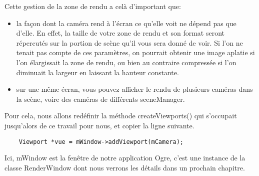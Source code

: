 \documentclass[10pt,a4paper]{report}
\begin{document}
Cette gestion de la zone de rendu a cel\`{a} d'important que:
\begin{itemize}
\item la fa\c{c}on dont la cam\'era rend \`{a} l'\'ecran ce qu'elle voit ne d\'epend pas que d'elle. En effet, la taille de votre zone de rendu et son format seront r\'epercut\'es sur la portion de sc\`ene qu'il vous sera donn\'e de voir. Si l'on ne tenait pas compte de ces param\`etres, on pourrait obtenir une image aplatie si l'on \'elargissait la zone de rendu, ou bien au contraire compress\'ee si l'on diminuait la largeur en laissant la hauteur constante.
\item sur une m\^eme \'ecran, vous pouvez afficher le rendu de plusieurs cam\'eras dans la sc\`ene, voire des cam\'eras de diff\'erents sceneManager.
\end{itemize}

\begin{comment}
LA VERSION AVANT D'AJOUTER LA LISTE ITEMIZE
La fa\c{c}on dont la cam\'era rend \`{a} l'\'ecran ce qu'elle voit ne d\'epend pas que d'elle. En effet, la taille de votre zone de rendu et son format seront r\'epercut\'es sur la portion de sc\`ene qu'il vous sera donn\'e de voir. Si l'on ne tenait pas compte de ces param\`etres, on pourrait obtenir une image aplatie si l'on \'elargit la zone de rendu, ou bien au contraire compress\'ee si l'on diminue la largeur en laissant la hauteur constante.

La fen\^etre de votre application est un objet distinct de la zone de rendu. En effet, dans une m\^eme fen\^etre, vous pouvez afficher le rendu de plusieurs cam\'era dans la sc\`ene, voire des cam\'eras de diff\'erents sceneManager.

La gestion de l'affichage dans une zone de rendu est laiss\'ee \`{a} la classe Viewport, qui est simplement la partie de votre fen\^etre o\`{u} s'affiche ce que voit votre cam\'era. De ces deux liens d\'ecoule la cr\'eation du Viewport, appel\'ee par la fen\^etre et prenant en param\`etre la cam\'era concern\'ee.
\end{comment}

Pour cela, nous allons red\'efinir la m\'ethode createViewports() qui s'occupait jusqu'alors de ce travail pour nous, et copier la ligne suivante.

\begin{lstlisting}
	Viewport *vue = mWindow->addViewport(mCamera);
\end{lstlisting}

Ici, mWindow est la fen\^etre de notre application Ogre, c'est une instance de la classe RenderWindow dont nous verrons les d\'etails dans un prochain chapitre.
\end{document}

